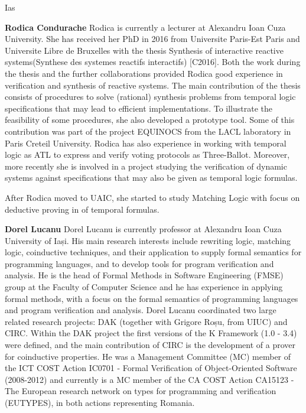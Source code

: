 \begin{sitedescription}{Ias}
\begin{compactitem}
\item{\bf Rodica Condurache}
Rodica is currently a lecturer at Alexandru Ioan Cuza University. She has received her PhD in 2016 from Universite Paris-Est Paris and Universite Libre de Bruxelles with the thesis Synthesis of interactive reactive systems(Synthese des systemes reactifs interactifs) [C2016]. Both the work during the thesis and the further collaborations provided Rodica good experience in verification and synthesis of reactive systems. 
The main contribution of the thesis consists of procedures to solve (rational) synthesis problems from temporal logic specifications that may lead to efficient implementations. To illustrate the feasibility of some procedures, she also developed a prototype tool. Some of this contribution was part of the project EQUINOCS from the LACL laboratory in Paris Creteil University.
Rodica has also experience in working with temporal logic as ATL to express and verify voting protocols as Three-Ballot. Moreover, more recently she is involved in a project studying the verification of dynamic systems against specifications that may also be given as temporal logic formulas.

After Rodica moved to UAIC, she started to study Matching Logic with focus on deductive proving in of temporal formulas.

\item{\bf Dorel Lucanu}
Dorel Lucanu is currently professor at Alexandru Ioan Cuza University of Iași. His main research interests include rewriting logic, matching logic, coinductive techniques, and their application to supply formal semantics for programming languages, and to develop tools for program verification and analysis. He is the head of Formal Methods in Software Engineering (FMSE) group at the Faculty of Computer Science and he has experience in applying formal methods, with a focus on the formal semantics of programming languages and program verification and analysis. 
Dorel Lucanu coordinated two large related research projects: DAK (together with Grigore Roșu, from UIUC) and CIRC. Within the DAK project the first versions of the K Framework (1.0 - 3.4) were defined, and the main contribution of CIRC is the development of a prover for coinductive properties.
He was a Management Committee (MC) member of the ICT COST Action IC0701 - Formal Verification of Object-Oriented Software (2008-2012) and currently is a MC member of the CA COST Action CA15123 - The European research network on types for programming and verification (EUTYPES), in both actions representing Romania.


\end{compactitem}
\end{sitedescription}
